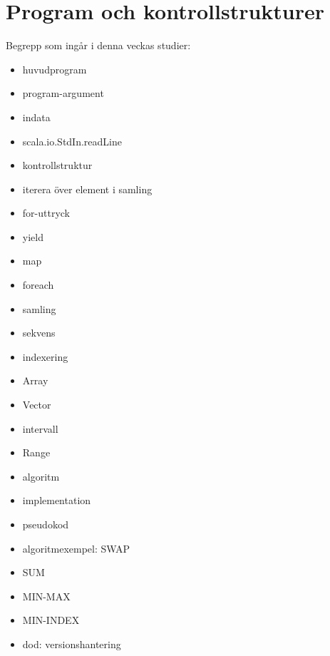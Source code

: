 \chapter{Program och kontrollstrukturer}\label{chapter:W02}
Begrepp som ingår i denna veckas studier:
\begin{itemize}[noitemsep,label={$\square$},leftmargin=*]
\item huvudprogram
\item program-argument
\item indata
\item scala.io.StdIn.readLine
\item kontrollstruktur
\item iterera över element i samling
\item for-uttryck
\item yield
\item map
\item foreach
\item samling
\item sekvens
\item indexering
\item Array
\item Vector
\item intervall
\item Range
\item algoritm
\item implementation
\item pseudokod
\item algoritmexempel: SWAP
\item SUM
\item MIN-MAX
\item MIN-INDEX
\item dod: versionshantering\end{itemize}
